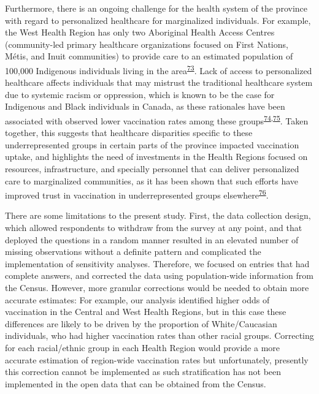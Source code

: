 \documentclass[
]{article}
\begin{document}
Furthermore, there is an ongoing challenge for the health system of the
province with regard to personalized healthcare for marginalized
individuals. For example, the West Health Region has only two Aboriginal
Health Access Centres (community-led primary healthcare organizations
focused on First Nations, Métis, and Inuit communities) to provide care
to an estimated population of 100,000 Indigenous individuals living in
the area\textsuperscript{\protect\hyperlink{ref-ontariohealth}{73}}.
Lack of access to personalized healthcare affects individuals that may
mistrust the traditional healthcare system due to systemic racism or
oppression, which is known to be the case for Indigenous and Black
individuals in Canada, as these rationales have been associated with
observed lower vaccination rates among these
groups\textsuperscript{\protect\hyperlink{ref-smylie2022}{74},\protect\hyperlink{ref-eissa2021}{75}}.
Taken together, this suggests that healthcare disparities specific to
these underrepresented groups in certain parts of the province impacted
vaccination uptake, and highlights the need of investments in the Health
Regions focused on resources, infrastructure, and specially personnel
that can deliver personalized care to marginalized communities, as it
has been shown that such efforts have improved trust in vaccination in
underrepresented groups
elsewhere\textsuperscript{\protect\hyperlink{ref-schafferderoo2020}{76}}.

There are some limitations to the present study. First, the data
collection design, which allowed respondents to withdraw from the survey
at any point, and that deployed the questions in a random manner
resulted in an elevated number of missing observations without a
definite pattern and complicated the implementation of sensitivity
analyses. Therefore, we focused on entries that had complete answers,
and corrected the data using population-wide information from the
Census. However, more granular corrections would be needed to obtain
more accurate estimates: For example, our analysis identified higher
odds of vaccination in the Central and West Health Regions, but in this
case these differences are likely to be driven by the proportion of
White/Caucasian individuals, who had higher vaccination rates than other
racial groups. Correcting for each racial/ethnic group in each Health
Region would provide a more accurate estimation of region-wide
vaccination rates but unfortunately, presently this correction cannot be
implemented as such stratification has not been implemented in the open
data that can be obtained from the Census.
\end{document}
